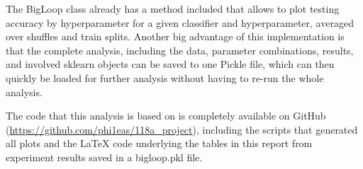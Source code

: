 \documentclass[twoside,11pt]{article}
\begin{document}
		The BigLoop class already has a method included that allows to plot testing accuracy by hyperparameter for a given classifier and hyperparameter, averaged over shuffles and train splits. Another big advantage of this implementation is that the complete analysis, including the data, parameter combinations, results, and involved sklearn objects can be saved to one Pickle file, which can then quickly be loaded for further analysis without having to re-run the whole analysis.
		
		The code that this analysis is based on is completely available on GitHub (\url{https://github.com/phi1eas/118a_project}), including the scripts that generated all plots and the \LaTeX \hspace{.2em} code underlying the tables in this report from experiment results saved in a bigloop.pkl file.
		
		\vskip 0.2in
		
	
	
	
	
	
	
%	
	
	
	
	
\end{document}
